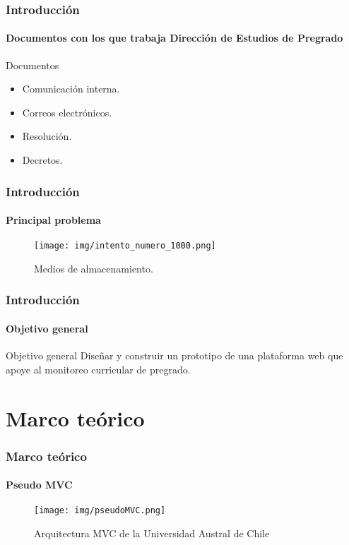 \documentclass{beamer}
\begin{document}

\begin{frame}
\frametitle{Introducción}
\framesubtitle{Documentos con los que trabaja Dirección de Estudios de Pregrado}
\begin{block}{Documentos}
\begin{itemize}
	\item Comunicación interna.
	\item Correos electrónicos.
	\item Resolución.
	\item Decretos.
\end{itemize}
\end{block}
\end{frame}
\begin{frame}    
\frametitle{Introducción}   
    \framesubtitle{Principal problema}

    
    \begin{figure}
        \texttt{[image: img/intento\_numero\_1000.png]}
        \caption{Medios de almacenamiento.}
    \end{figure}        
\end{frame} 






\begin{frame}
\frametitle{Introducción}
\framesubtitle{Objetivo general}
\pause
\begin{block}{Objetivo general}
	Diseñar y construir  un prototipo de una plataforma web que apoye al monitoreo curricular de pregrado.
\end{block}
\end{frame}







\section{Marco teórico}

\begin{frame}
\frametitle{Marco teórico}
\framesubtitle{Pseudo MVC}
    \begin{figure}
        \texttt{[image: img/pseudoMVC.png]}
        \caption{Arquitectura MVC de la Universidad Austral de Chile}
    \end{figure}  
\end{frame}
\end{document}

